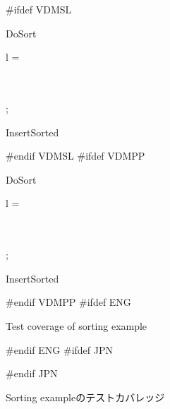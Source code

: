 \documentclass[\pformat,12pt]{article}
\begin{document}
\begin{figure}[tbh]
#ifdef VDMSL
\small{
\begin{vdm}
\begin{fn}[e]{DoSort}%
\signature{\seqof*{\Real } \To \seqof*{\Real }}
\If l = \seq{}
\Then\\ \seq{}
\Else\\ \begin{letexpr}
\end{letexpr}\\
\Fi;
\end{fn}

\begin{fn}[e]{InsertSorted}%
\signature{PosReal \Mult {} \To {}}
\begin{Cases}{\True }
\end{Cases}
\end{fn}
\end{vdm}}
#endif VDMSL
#ifdef VDMPP
\small{
\begin{vdm}
\begin{fn}[e]{DoSort}%
\signature{\seqof*{\Real } \To \seqof*{\Real }}
\If l = \seq{}
\Then\\ \seq{}
\Else\\ \begin{letexpr}
\end{letexpr}\\
\Fi;\\
\end{fn}
\begin{fn}[e]{InsertSorted}%
\signature{PosReal \Mult {} \To {}}
\begin{Cases}{\True }
\end{Cases}
\end{fn}
\end{vdm}}
#endif VDMPP
#ifdef ENG
\caption{Test coverage of sorting example}
#endif ENG
#ifdef JPN
\caption{Sorting exampleのテストカバレッジ}
#endif JPN
\label{fig:tc-sort}
\end{figure}
\end{document}
